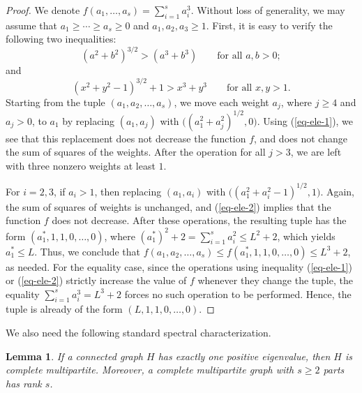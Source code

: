 \documentclass[11pt,a4paper]{article}
\newtheorem{lemma}[theorem]{Lemma}
\theoremstyle{definition}
\theoremstyle{plain}
\renewcommand{\le}{\leqslant}
\renewcommand{\ge}{\geqslant}
\begin{document}
\begin{proof}
We denote $f(a_1,\ldots ,a_s)=\sum_{i=1}^s a_i^3$. 
    Without loss of generality, we may assume that 
    $a_1\ge \cdots \ge a_s\ge 0$ and $a_1,a_2,a_3\ge 1$. 
    First, it is easy to verify the following two inequalities: 
   \begin{equation} \label{eq-ele-1}
   (a^2+b^2)^{3/2} > (a^3+b^3) \qquad  \text{for all $a,b> 0$}; 
   \end{equation}
   and 
   \begin{equation} \label{eq-ele-2}
   (x^2+y^2-1)^{3/2} +1 > x^3+y^3 \qquad 
   \text{for all $x,y> 1$}.
   \end{equation}
   Starting from the tuple $(a_1,a_2,\ldots,a_s)$, we move each weight $a_j$, where $j\ge 4$ and $a_j >0$, to $a_1$ by replacing $(a_1,a_j)$ with $\big((a_1^2+a_j^2)^{1/2},0 \big)$. Using (\ref{eq-ele-1}), we see that this replacement 
   does not decrease the function $f$, and does not change the sum of squares of the weights. 
   After the operation for all $j>3$, we are left with three nonzero weights at least $1$. 

   
For $i=2,3$, if $a_i>1$, then replacing $(a_1,a_i)$ with 
$\big( (a_1^2+a_i^2 -1)^{1/2},1 \big)$. Again, the sum of squares of weights is unchanged, and (\ref{eq-ele-2}) implies that the function $f$ does not decrease. After these operations, the resulting tuple has the form $(a_1^*,1,1,0,\ldots ,0)$, where $(a_1^*)^2+2 =\sum_{i=1}^s a_i^2 \le L^2+2$, which yields $a_1^* \le L$. Thus, we conclude that $f(a_1,a_2,\ldots ,a_s)\le f(a_1^*,1,1,0,\ldots ,0)\le L^3+2$, as needed.  
For the equality case, since the operations using inequality (\ref{eq-ele-1}) or (\ref{eq-ele-2}) strictly increase the value of $f$ whenever they change the tuple, the equality $\sum_{i=1}^s a_i^3 =L^3+2$ forces no such operation to be performed. Hence, the tuple is already of the form $(L,1,1,0,\ldots ,0)$. 
\end{proof}


We also need the following standard spectral characterization.

\begin{lemma} \label{lem-one-positive}
If a connected graph $H$ has exactly one positive  eigenvalue, then $H$ is complete multipartite. Moreover, a complete multipartite graph with $s\ge 2$ parts has rank $s$. 
\end{lemma}
\end{document}
